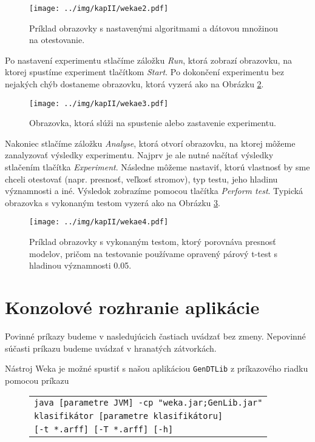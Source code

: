 \begin{figure}[h!]
\centering
\centerline{\mbox{\texttt{[image: ../img/kapII/wekae2.pdf]}}}
\caption{Príklad obrazovky s nastavenými algoritmami a dátovou množinou na otestovanie.}\label{fig:guie2}
\end{figure}

Po nastavení experimentu stlačíme záložku \emph{Run}, ktorá zobrazí obrazovku, na ktorej spustíme experiment tlačítkom \emph{Start}. Po dokončení experimentu bez nejakých chýb dostaneme obrazovku, ktorá vyzerá ako na Obrázku \ref{fig:guie3}.

\begin{figure}[h!]
\centering
\centerline{\mbox{\texttt{[image: ../img/kapII/wekae3.pdf]}}}
\caption{Obrazovka, ktorá slúži na spustenie alebo zastavenie experimentu.}\label{fig:guie3}
\end{figure}

Nakoniec stlačíme záložku \emph{Analyse}, ktorá otvorí obrazovku, na ktorej môžeme zanalyzovať výsledky experimentu. Najprv je ale nutné načítať výsledky stlačením tlačítka \emph{Experiment}. Následne môžeme nastaviť, ktorú vlastnosť by sme chceli otestovať (napr. presnosť, veľkosť stromov), typ testu, jeho hladinu významnosti a iné. Výsledok zobrazíme pomocou tlačítka \emph{Perform test}. Typická obrazovka s vykonaným testom vyzerá ako na Obrázku \ref{fig:guie4}.

\begin{figure}[h!]
\centering
\centerline{\mbox{\texttt{[image: ../img/kapII/wekae4.pdf]}}}
\caption{Príklad obrazovky s vykonaným testom, ktorý porovnáva presnosť modelov, pričom na testovanie používame opravený párový t-test s hladinou významnosti 0.05.}\label{fig:guie4}
\end{figure}

\pagebreak

\section{Konzolové rozhranie aplikácie}
\begin{observation}
Povinné príkazy budeme v nasledujúcich častiach uvádzať bez zmeny. Nepovinné súčasti príkazu budeme uvádzať v hranatých zátvorkách.
\end{observation}

Nástroj Weka je možné spustiť s našou aplikáciou \verb|GenDTLib| z príkazového riadku pomocou príkazu

\begin{figure}[h!]
\centering
\begin{tabular}{|l|}
\hline
\texttt{java [parametre JVM] -cp "weka.jar;GenLib.jar"}  \\
\texttt{klasifikátor [parametre klasifikátoru]} \\
\texttt{[-t *.arff] [-T *.arff] [-h]} \\
\hline
\end{tabular}
\caption{}
\end{figure}

